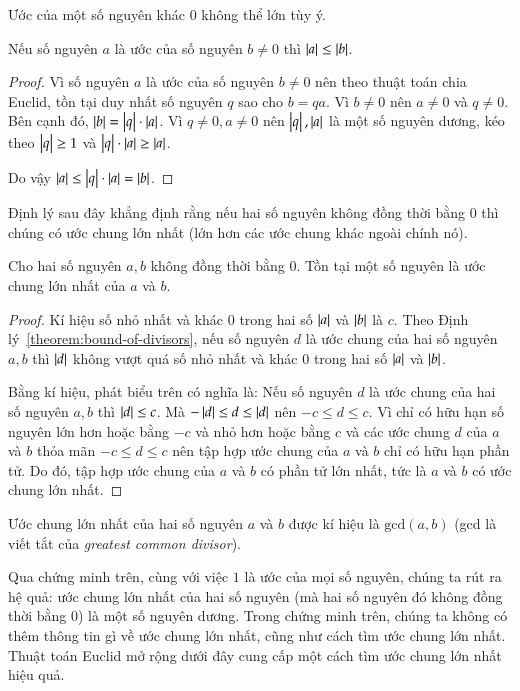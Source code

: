 Ước của một số nguyên khác $0$ không thể lớn tùy ý.
\begin{theorem}\label{theorem:bound-of-divisors}
	Nếu số nguyên $a$ là ước của số nguyên $b\ne 0$ thì $\left\vert{a}\right\vert\leq \left\vert{b}\right\vert$.
\end{theorem}

\begin{proof}
	Vì số nguyên $a$ là ước của số nguyên $b\ne 0$ nên theo thuật toán chia Euclid, tồn tại duy nhất số nguyên $q$ sao cho $b = qa$. Vì $b\ne 0$ nên $a\ne 0$ và $q\ne 0$. Bên cạnh đó, $\left\vert{b}\right\vert = \left\vert{q}\right\vert\cdot\left\vert{a}\right\vert$. Vì $q\ne 0, a\ne 0$ nên $\left\vert{q}\right\vert, \left\vert{a}\right\vert$ là một số nguyên dương, kéo theo $\left\vert{q}\right\vert\geq 1$ và $\left\vert{q}\right\vert\cdot\left\vert{a}\right\vert \geq \left\vert{a}\right\vert$.

	Do vậy $\left\vert{a}\right\vert\leq \left\vert{q}\right\vert\cdot\left\vert{a}\right\vert = \left\vert{b}\right\vert$.
\end{proof}

Định lý sau đây khẳng định rằng nếu hai số nguyên không đồng thời bằng $0$ thì chúng có ước chung lớn nhất (lớn hơn các ước chung khác ngoài chính nó).
\begin{theorem}
	Cho hai số nguyên $a, b$ không đồng thời bằng $0$. Tồn tại một số nguyên là ước chung lớn nhất của $a$ và $b$.
\end{theorem}

\begin{proof}
	Kí hiệu số nhỏ nhất và khác $0$ trong hai số $\left\vert{a}\right\vert$ và $\left\vert{b}\right\vert$ là $c$. Theo Định lý~\ref{theorem:bound-of-divisors}, nếu số nguyên $d$ là ước chung của hai số nguyên $a, b$ thì $\left\vert{d}\right\vert$ không vượt quá số nhỏ nhất và khác $0$ trong hai số $\left\vert{a}\right\vert$ và $\left\vert{b}\right\vert$.

	Bằng kí hiệu, phát biểu trên có nghĩa là: Nếu số nguyên $d$ là ước chung của hai số nguyên $a, b$ thì $\left\vert{d}\right\vert\leq c$. Mà $-\left\vert{d}\right\vert\leq d \leq \left\vert{d}\right\vert$ nên $-c\leq d\leq c$. Vì chỉ có hữu hạn số nguyên lớn hơn hoặc bằng $-c$ và nhỏ hơn hoặc bằng $c$ và các ước chung $d$ của $a$ và $b$ thỏa mãn $-c\leq d\leq c$ nên tập hợp ước chung của $a$ và $b$ chỉ có hữu hạn phần tử. Do đó, tập hợp ước chung của $a$ và $b$ có phần tử lớn nhất, tức là $a$ và $b$ có ước chung lớn nhất.
\end{proof}

Ước chung lớn nhất của hai số nguyên $a$ và $b$ được kí hiệu là $\text{gcd}(a, b)$ (gcd là viết tắt của \textit{greatest common divisor}).

Qua chứng minh trên, cùng với việc $1$ là ước của mọi số nguyên, chúng ta rút ra hệ quả: ước chung lớn nhất của hai số nguyên (mà hai số nguyên đó không đồng thời bằng $0$) là một số nguyên dương. Trong chứng minh trên, chúng ta không có thêm thông tin gì về ước chung lớn nhất, cũng như cách tìm ước chung lớn nhất. Thuật toán Euclid mở rộng dưới đây cung cấp một cách tìm ước chung lớn nhất hiệu quả.

